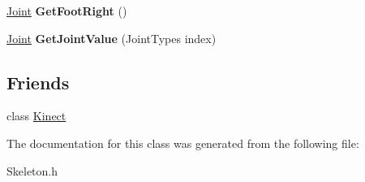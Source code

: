\begin{DoxyCompactItemize}
\item 
\hypertarget{classSkeleton_a766d6d5dc88ba2405bea47f8dc690e0c}{
\hyperlink{structSkeleton_1_1Joint}{Joint} {\bfseries GetFootRight} ()}
\label{classSkeleton_a766d6d5dc88ba2405bea47f8dc690e0c}

\item 
\hypertarget{classSkeleton_ab78572a7d7170f2ec5736d83ce5db7f9}{
\hyperlink{structSkeleton_1_1Joint}{Joint} {\bfseries GetJointValue} (JointTypes index)}
\label{classSkeleton_ab78572a7d7170f2ec5736d83ce5db7f9}

\end{DoxyCompactItemize}
\subsection*{Friends}
\begin{DoxyCompactItemize}
\item 
\hypertarget{classSkeleton_a873a6d4efd00605c1f4bcf79c0e5d973}{
class \hyperlink{classSkeleton_a873a6d4efd00605c1f4bcf79c0e5d973}{Kinect}}
\label{classSkeleton_a873a6d4efd00605c1f4bcf79c0e5d973}

\end{DoxyCompactItemize}


The documentation for this class was generated from the following file:\begin{DoxyCompactItemize}
\item 
Skeleton.h\end{DoxyCompactItemize}
